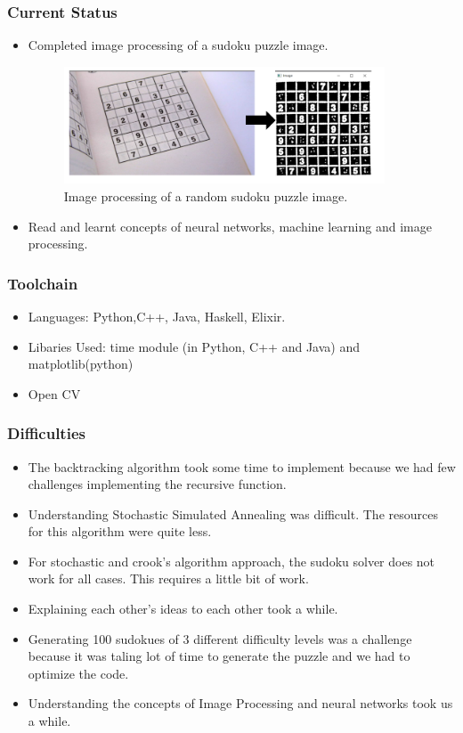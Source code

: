 \documentclass{beamer}
\begin{document}
\begin{frame}
	\frametitle{Current Status}
	\begin{itemize}
	      \item Completed image processing of a sudoku puzzle image.
		  \begin{figure}
		  \includegraphics[width=0.9\textwidth]{./week7_img/image_processed.png}
		  \caption{Image processing of a random sudoku puzzle image.}
		  \centering
		  \end{figure}
		  \item Read and learnt concepts of neural networks, machine learning and image processing.
	\end{itemize}
\end{frame}

\begin{frame}
     \frametitle{Toolchain}
     \begin{itemize}
          \item Languages: Python,C++, Java, Haskell, Elixir.
          \item Libaries Used: time module (in Python, C++ and Java) and matplotlib(python)
          \item Open CV 
     \end{itemize}
\end{frame}

\begin{frame}
     \frametitle{Difficulties}
     \begin{itemize}
          \item The backtracking algorithm took some time to implement because we had few challenges implementing the recursive function.
		  \item Understanding Stochastic Simulated Annealing was difficult. The resources for this algorithm were quite less.
	      \item For stochastic and crook's algorithm approach, the sudoku solver does not work for all cases. This requires a little bit of work.
		  \item Explaining each other's ideas to each other took a while.
		  \item Generating 100 sudokues of 3 different difficulty levels was a challenge because it was taling lot of time to generate the puzzle and we had to optimize the code.
		  \item Understanding the concepts of Image Processing and neural networks took us a while.
\end{itemize}
\end{frame}
\end{document}
